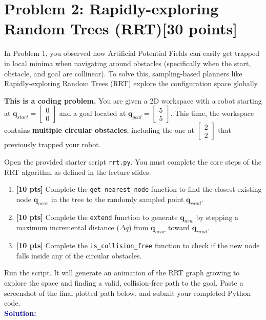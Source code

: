 \documentclass[11pt,letterpaper]{article}
\newcommand{\solutionspace}{%
  \vspace{0.2em}%
  \noindent\textbf{\textcolor{blue}{Solution:}}\par
}
\begin{document}
\vspace{0.5cm}

\section*{Problem 2: Rapidly-exploring Random Trees (RRT)[30 points]}
In Problem 1, you observed how Artificial Potential Fields can easily get trapped in local minima when navigating around obstacles (specifically when the start, obstacle, and goal are collinear). To solve this, sampling-based planners like Rapidly-exploring Random Trees (RRT) explore the configuration space globally.

\textbf{This is a coding problem.} You are given a 2D workspace with a robot starting at $\mathbf{q}_{start} = \begin{bmatrix} 0 \\ 0 \end{bmatrix}$ and a goal located at $\mathbf{q}_{goal} = \begin{bmatrix} 5 \\ 5 \end{bmatrix}$. This time, the workspace contains \textbf{multiple circular obstacles}, including the one at $\begin{bmatrix} 2 \\ 2 \end{bmatrix}$ that previously trapped your robot.

Open the provided starter script \texttt{rrt.py}. You must complete the core steps of the RRT algorithm as defined in the lecture slides:
\begin{enumerate}
    \item \textbf{[10 pts]} Complete the \texttt{get\_nearest\_node} function to find the closest existing node $\mathbf{q}_{near}$ in the tree to the randomly sampled point $\mathbf{q}_{rand}$.
    \item \textbf{[10 pts]} Complete the \texttt{extend} function to generate $\mathbf{q}_{new}$ by stepping a maximum incremental distance ($\Delta q$) from $\mathbf{q}_{near}$ toward $\mathbf{q}_{rand}$.
    \item \textbf{[10 pts]} Complete the \texttt{is\_collision\_free} function to check if the new node falls inside any of the circular obstacles.
\end{enumerate}

Run the script. It will generate an animation of the RRT graph growing to explore the space and finding a valid, collision-free path to the goal. Paste a screenshot of the final plotted path below, and submit your completed Python code. \\
\solutionspace
    \vspace{0.3cm}
\end{document}
